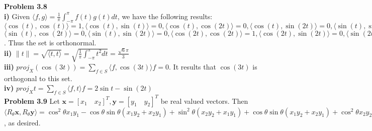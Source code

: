 \documentclass[letterpaper,12pt]{article}
\theoremstyle{definition}
\begin{document}
\noindent\textbf{Problem 3.8}\\
\textbf{i)} Given $\langle f, g \rangle = \frac{1}{\pi}\int_{-\pi}^{\pi}f(t)g(t)dt$, we have the following results: $\langle \cos(t), \cos(t) \rangle = 1, \langle \cos(t), \sin(t) \rangle = 0, \langle \cos(t), \cos(2t) \rangle = 0, \langle \cos(t), \sin(2t) \rangle = 0, \langle \sin(t), \sin(t) \rangle = 1,$ $\langle \sin(t), \cos(2t) \rangle = 0, \langle \sin(t), \sin(2t) \rangle = 0, \langle \cos(2t),\cos(2t) \rangle = 1, \langle \cos(2t),\sin(2t) \rangle = 0, \langle \sin(2t),\sin(2t) \rangle = 1$. Thus the set is orthonormal.\\
\textbf{ii)} $\|t\| = \sqrt{\langle t,t \rangle} = \sqrt{ \frac{1}{\pi}\int_{-\pi}^{\pi}t^2dt } = \frac{\sqrt{6} \pi }{3}$\\
\textbf{iii)} $proj_X(\cos (3t)) = \sum_{f \in S} \langle f, \cos (3t) \rangle f = 0$. It results that $\cos (3t)$ is orthogonal to this set.\\
\textbf{iv)} $proj_Xt = \sum_{f \in S} \langle f, t \rangle f = 2 \sin t - \sin (2t)$\\


\noindent\textbf{Problem 3.9}
Let $\textbf{x} = [x_1 \quad x_2]^T, \textbf{y} = [y_1 \quad y_2]^T$ be real valued vectors. Then $\langle R_{\theta}\textbf{x}, R_{\theta}\textbf{y} \rangle = \cos ^ 2 \theta x_1 y_1 - \cos \theta \sin \theta (x_1 y_2 + x_2 y_1 ) + \sin ^ 2 \theta ( x_2 y_2 +x_1 y_1) + \cos \theta \sin \theta (x_1 y_2 + x_2 y_1 ) + \cos ^2 \theta x_2 y_2 = x_1 y_1 + x_2 y_2 = \langle x, y \rangle$, as desired.\\
\end{document}
